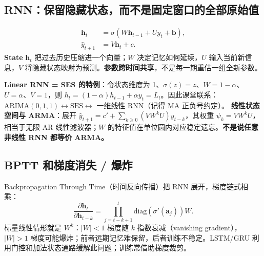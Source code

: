\documentclass[UTF8,fontset=fandol,10.5pt,a4paper]{ctexart}
\newcommand{\eng}[1]{{\sffamily\color{navy}#1}}
\newcommand{\formula}[1]{\[\boxed{#1}\]}
\begin{document}
\subsection{RNN：保留隐藏状态，而不是固定窗口的全部原始值}
\begin{keybox}
\begin{align*}
\mathbf h_t&=\sigma(W\mathbf h_{t-1}+U y_t+\mathbf b),\\
\hat y_{t+1}&=V\mathbf h_t+c.
\end{align*}
\textbf{State} $\mathbf h_t$ 把过去历史压缩进一个向量；$W$ 决定记忆如何延续，$U$ 输入当前新信息，$V$ 将隐藏状态映射为预测。\textbf{参数跨时间共享}，不是每一期重估一组全新参数。
\end{keybox}
\par\smallskip{}\par\smallskip
\textbf{Linear RNN = SES 的特例}：令状态维度为 1、$\sigma(z)=z$、$W=1-\alpha$、$U=\alpha$、$V=1$，则 $h_t=(1-\alpha)h_{t-1}+\alpha y_t=L_t$。因此课堂联系：$\text{ARIMA}(0,1,1)\leftrightarrow\text{SES}\leftrightarrow$ 一维线性 RNN（记得 MA 正负号约定）。
\textbf{线性状态空间与 ARMA}：展开 $\hat y_{t+1}=c'+\sum_{k\ge0}(VW^kU)y_{t-k}$，其权重 $\psi_k=VW^kU$，相当于无限 AR 线性滤波器；$W$ 的特征值在单位圆内对应稳定遗忘。\textbf{不是说任意非线性 RNN 都等价 ARMA。}
\subsection{BPTT 和梯度消失 / 爆炸}
\eng{Backpropagation Through Time}（时间反向传播）把 RNN 展开，梯度链式相乘：
\formula{\frac{\partial\mathbf h_t}{\partial\mathbf h_{t-k}}=\prod_{j=t-k+1}^{t}\mathrm{diag}(\sigma'(\mathbf a_j))W.}
标量线性情形就是 $W^k$：$|W|<1$ 梯度随 $k$ 指数衰减（\eng{vanishing gradient}），$|W|>1$ 梯度可能爆炸；前者远期记忆难保留，后者训练不稳定。LSTM/GRU 利用门控和加法状态通路缓解此问题；训练常借助梯度裁剪。
\end{document}
